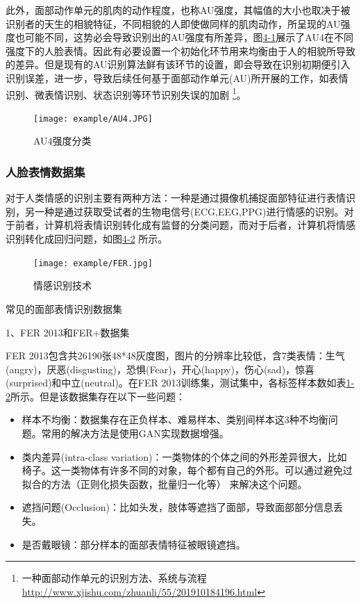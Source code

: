 此外，面部动作单元的肌肉的动作程度，也称AU强度，其幅值的大小也取决于被识别者的天生的相貌特征，不同相貌的人即使做同样的肌肉动作，所呈现的AU强度也可能不同，这势必会导致识别出的AU强度有所差异，图\href{fig:4-1}{4-1}展示了AU4在不同强度下的人脸表情。因此有必要设置一个初始化环节用来均衡由于人的相貌所导致的差异。但是现有的AU识别算法鲜有该环节的设置，即会导致在识别初期便引入识别误差，进一步，导致后续任何基于面部动作单元(AU)所开展的工作，如表情识别、微表情识别、状态识别等环节识别失误的加剧
\footnote{一种面部动作单元的识别方法、系统与流程 \quad \url{http://www.xjishu.com/zhuanli/55/201910184196.html}}。

\begin{figure}[t]
\centering
    \texttt{[image: example/AU4.JPG]}
    \caption{AU4强度分类}
    \label{fig:3-1}
\end{figure}

\subsubsection{人脸表情数据集}

对于人类情感的识别主要有两种方法：一种是通过摄像机捕捉面部特征进行表情识别，另一种是通过获取受试者的生物电信号(ECG,EEG,PPG)进行情感的识别。对于前者，计算机将表情识别转化成有监督的分类问题，而对于后者，计算机将情感识别转化成回归问题，如图\href{fig:4-2}{4-2} 所示。

\begin{figure}[t]
\centering
    \texttt{[image: example/FER.jpg]}
    \caption{情感识别技术}
\end{figure}

常见的面部表情识别数据集

1、FER 2013和FER+数据集

FER 2013包含共26190张48*48灰度图，图片的分辨率比较低，含7类表情：生气(angry)，厌恶(disgusting)，恐惧(Fear)，开心(happy)，伤心(sad)，惊喜(surprised)和中立(neutral)。在FER 2013训练集，测试集中，各标签样本数如表\href{table:1-2}{1-2}所示。但是该数据集存在以下一些问题：
\begin{itemize}
	\item 样本不均衡：数据集存在正负样本、难易样本、类别间样本这3种不均衡问题。常用的解决方法是使用GAN实现数据增强。
	\item 类内差异(intra-class variation)：一类物体的个体之间的外形差异很大，比如椅子。这一类物体有许多不同的对象，每个都有自己的外形。可以通过避免过拟合的方法（正则化损失函数，批量归一化等） 来解决这个问题。
	\item 遮挡问题(Occlusion)：比如头发，肢体等遮挡了面部，导致面部部分信息丢失。
    \item 是否戴眼镜：部分样本的面部表情特征被眼镜遮挡。
\end{itemize}

